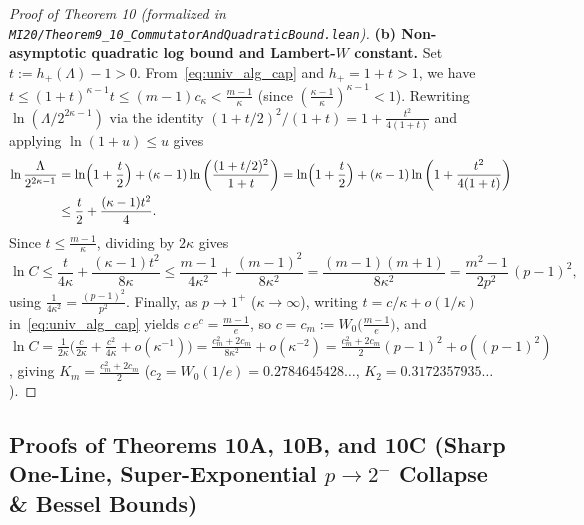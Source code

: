 \documentclass[10pt,letterpaper]{article}
\begin{document}
\begin{proof}[Proof of Theorem 10 (formalized in \texttt{MI20/Theorem9\_10\_\allowbreak CommutatorAndQuadraticBound.lean})]
\textbf{(b) Non-asymptotic quadratic log bound and Lambert-$W$ constant.} Set $t := h_+(\Lambda) - 1 > 0$. From~\eqref{eq:univ_alg_cap} and $h_+ = 1 + t > 1$, we have $t \le (1+t)^{\kappa-1} t \le (m-1)c_\kappa < \frac{m-1}{\kappa}$ (since $(\frac{\kappa-1}{\kappa})^{\kappa-1} < 1$). Rewriting $\ln(\Lambda / 2^{2\kappa-1})$ via the identity $(1 + t/2)^2 / (1 + t) = 1 + \frac{t^2}{4(1+t)}$ and applying $\ln(1 + u) \le u$ gives
\begin{align*}
  \ln\frac{\Lambda}{2^{2\kappa-1}}
  &= \ln\Bigl(1 + \frac{t}{2}\Bigr) + (\kappa - 1)\ln\left(\frac{(1 + t/2)^2}{1 + t}\right)
   = \ln\Bigl(1 + \frac{t}{2}\Bigr) + (\kappa - 1)\ln\left(1 + \frac{t^2}{4(1+t)}\right) \\
  &\le \frac{t}{2} + \frac{(\kappa - 1) t^2}{4}.
\end{align*}
Since $t \le \frac{m-1}{\kappa}$, dividing by $2\kappa$ gives
\[
  \ln C \le \frac{t}{4\kappa} + \frac{(\kappa - 1)t^2}{8\kappa}
  \le \frac{m - 1}{4\kappa^2} + \frac{(m - 1)^2}{8\kappa^2}
  = \frac{(m - 1)(m + 1)}{8\kappa^2}
  = \frac{m^2 - 1}{2p^2}\,(p - 1)^2,
\]
using $\frac{1}{4\kappa^2} = \frac{(p-1)^2}{p^2}$. Finally, as $p \to 1^+$ ($\kappa \to \infty$), writing $t = c/\kappa + o(1/\kappa)$ in~\eqref{eq:univ_alg_cap} yields $c\, e^c = \frac{m-1}{e}$, so $c = c_m := W_0\bigl(\frac{m-1}{e}\bigr)$, and $\ln C = \frac{1}{2\kappa}\bigl(\frac{c}{2\kappa} + \frac{c^2}{4\kappa} + o(\kappa^{-1})\bigr) = \frac{c_m^2 + 2c_m}{8\kappa^2} + o(\kappa^{-2}) = \frac{c_m^2 + 2c_m}{2}(p - 1)^2 + o((p-1)^2)$, giving $K_m = \frac{c_m^2 + 2c_m}{2}$ ($c_2 = W_0(1/e) = 0.2784645428\dots$, $K_2 = 0.3172357935\dots$).
\end{proof}

\subsection{Proofs of Theorems 10A, 10B, and 10C (Sharp One-Line, Super-Exponential \texorpdfstring{$p \to 2^-$}{p -> 2-} Collapse \& Bessel Bounds)}
\end{document}
